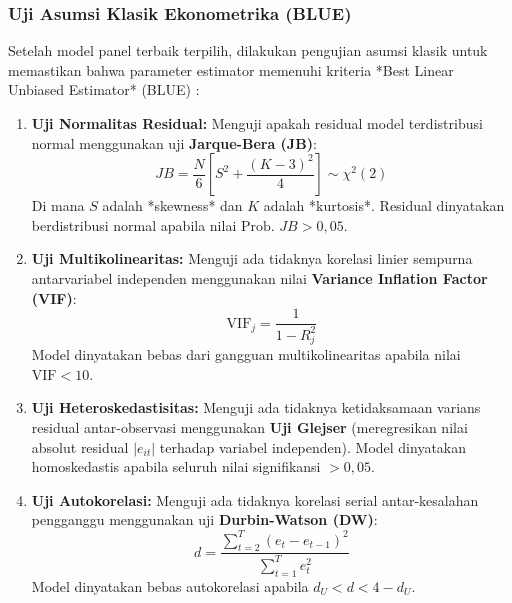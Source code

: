 \documentclass[12pt,a4paper]{article}
\numberwithin{equation}{section}
\begin{document}
\subsubsection{Uji Asumsi Klasik Ekonometrika (BLUE)}
\noindent
Setelah model panel terbaik terpilih, dilakukan pengujian asumsi klasik untuk memastikan bahwa parameter estimator memenuhi kriteria *Best Linear Unbiased Estimator* (BLUE) \citep{GujaratiPorter2020}:
\begin{enumerate}
  \item \textbf{Uji Normalitas Residual:} Menguji apakah residual model terdistribusi normal menggunakan uji \textbf{Jarque-Bera (JB)}:
    \begin{equation}
      JB = \frac{N}{6} \left[ S^2 + \frac{(K - 3)^2}{4} \right] \sim \chi^2(2)
    \end{equation}
    Di mana $S$ adalah *skewness* dan $K$ adalah *kurtosis*. Residual dinyatakan berdistribusi normal apabila nilai $\text{Prob. } JB > 0{,}05$.
  \item \textbf{Uji Multikolinearitas:} Menguji ada tidaknya korelasi linier sempurna antarvariabel independen menggunakan nilai \textbf{Variance Inflation Factor (VIF)}:
    \begin{equation}
      \text{VIF}_j = \frac{1}{1 - R_j^2}
    \end{equation}
    Model dinyatakan bebas dari gangguan multikolinearitas apabila nilai $\text{VIF} < 10$.
  \item \textbf{Uji Heteroskedastisitas:} Menguji ada tidaknya ketidaksamaan varians residual antar-observasi menggunakan \textbf{Uji Glejser} (meregresikan nilai absolut residual $|e_{it}|$ terhadap variabel independen). Model dinyatakan homoskedastis apabila seluruh nilai signifikansi $> 0{,}05$.
  \item \textbf{Uji Autokorelasi:} Menguji ada tidaknya korelasi serial antar-kesalahan pengganggu menggunakan uji \textbf{Durbin-Watson (DW)}:
    \begin{equation}
      d = \frac{\sum_{t=2}^T (e_t - e_{t-1})^2}{\sum_{t=1}^T e_t^2}
    \end{equation}
    Model dinyatakan bebas autokorelasi apabila $d_U < d < 4 - d_U$.
\end{enumerate}
\end{document}
